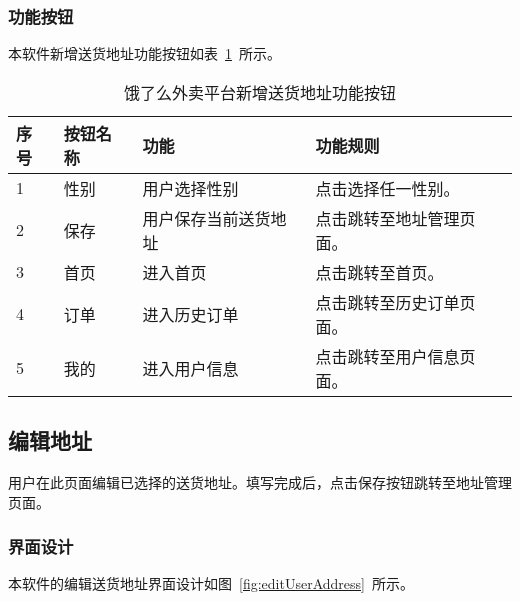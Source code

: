 \subsubsection{功能按钮}
本软件新增送货地址功能按钮如表~\ref{tab:table11}~所示。
\begin{table}[htbp]
    \caption{饿了么外卖平台新增送货地址功能按钮}\label{tab:table11}
    \vspace{0.5em}\wuhao
    \begin{tabularx}{\textwidth}{lllX}
    \toprule[1.5pt]
    序号 & 按钮名称 & 功能 & 功能规则 \\ 
    \midrule[1pt]
    1 & 性别 & 用户选择性别 & 点击选择任一性别。 \\
    2 & 保存 & 用户保存当前送货地址 & 点击跳转至地址管理页面。 \\
    3 & 首页 & 进入首页 & 点击跳转至首页。 \\
    4 & 订单 & 进入历史订单 & 点击跳转至历史订单页面。 \\
    5 & 我的 & 进入用户信息 & 点击跳转至用户信息页面。 \\
\bottomrule[1.5pt]
\end{tabularx}
\vspace{\baselineskip}
\end{table}

\subsection{编辑地址}
用户在此页面编辑已选择的送货地址。填写完成后，点击保存按钮跳转至地址管理页面。
\subsubsection{界面设计}
本软件的编辑送货地址界面设计如图~\ref{fig:editUserAddress}~所示。
